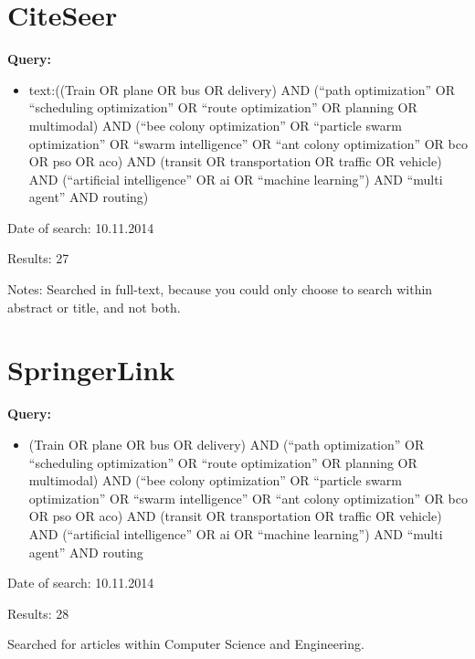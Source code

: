 \section{CiteSeer}
\textbf{Query:}
\begin{itemize}
\item text:((Train OR plane OR bus OR delivery) AND (``path optimization'' OR ``scheduling optimization'' OR ``route optimization'' OR planning OR multimodal) AND (``bee colony optimization'' OR ``particle swarm optimization'' OR ``swarm intelligence'' OR ``ant colony optimization'' OR bco OR pso OR aco) AND (transit OR transportation OR traffic OR vehicle) AND (``artificial intelligence'' OR ai OR ``machine learning'') AND ``multi agent'' AND routing)
\end{itemize}
\par Date of search: 10.11.2014
\par Results: 27
\par Notes: Searched in full-text, because you could only choose to search within abstract or title, and not both. 

\section{SpringerLink}
\textbf{Query:}
\begin{itemize}
\item (Train OR plane OR bus OR delivery) AND (``path optimization'' OR ``scheduling optimization'' OR ``route optimization'' OR planning OR multimodal) AND (``bee colony optimization'' OR ``particle swarm optimization'' OR ``swarm intelligence'' OR ``ant colony optimization'' OR bco OR pso OR aco) AND (transit OR transportation OR traffic OR vehicle) AND (``artificial intelligence'' OR ai OR ``machine learning'') AND ``multi agent'' AND routing
\end{itemize}
\par Date of search: 10.11.2014
\par Results: 28
\par Searched for articles within Computer Science and Engineering.

